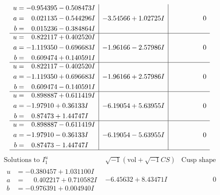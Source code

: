 \documentclass[1p]{elsarticle_modified}
\theoremstyle{definition}
\newcommand{\I}{\sqrt{-1}}
\begin{document}
$$\begin{array}{c|c|c}
\begin{aligned}
u &= -0.954395 - 0.508473 I \\
a &= \phantom{-}0.021135 - 0.544296 I \\
b &= \phantom{-}0.015236 - 0.384864 I\end{aligned}
 & -3.54566 + 1.02725 I & \phantom{-0.000000 } 0 \\ \hline\begin{aligned}
u &= \phantom{-}0.822117 + 0.402520 I \\
a &= -1.119350 - 0.696683 I \\
b &= \phantom{-}0.609474 + 0.140591 I\end{aligned}
 & -1.96166 - 2.57986 I & \phantom{-0.000000 } 0 \\ \hline\begin{aligned}
u &= \phantom{-}0.822117 - 0.402520 I \\
a &= -1.119350 + 0.696683 I \\
b &= \phantom{-}0.609474 - 0.140591 I\end{aligned}
 & -1.96166 + 2.57986 I & \phantom{-0.000000 } 0 \\ \hline\begin{aligned}
u &= \phantom{-}0.898887 + 0.611419 I \\
a &= -1.97910 + 0.36133 I \\
b &= \phantom{-}0.87473 + 1.44747 I\end{aligned}
 & -6.19054 + 5.63955 I & \phantom{-0.000000 } 0 \\ \hline\begin{aligned}
u &= \phantom{-}0.898887 - 0.611419 I \\
a &= -1.97910 - 0.36133 I \\
b &= \phantom{-}0.87473 - 1.44747 I\end{aligned}
 & -6.19054 - 5.63955 I & \phantom{-0.000000 } 0\\
 \hline 
 \end{array}$$\newpage$$\begin{array}{c|c|c}  
\text{Solutions to }I^u_{1}& \I (\text{vol} + \sqrt{-1}CS) & \text{Cusp shape}\\
 \hline 
\begin{aligned}
u &= -0.380457 + 1.031100 I \\
a &= \phantom{-}0.402217 + 0.710582 I \\
b &= -0.976391 + 0.004940 I\end{aligned}
 & -6.45632 + 8.43471 I & \phantom{-0.000000 } 0 \\ \hline\begin{aligned}

\end{aligned}
\end{array}$$
\end{document}
